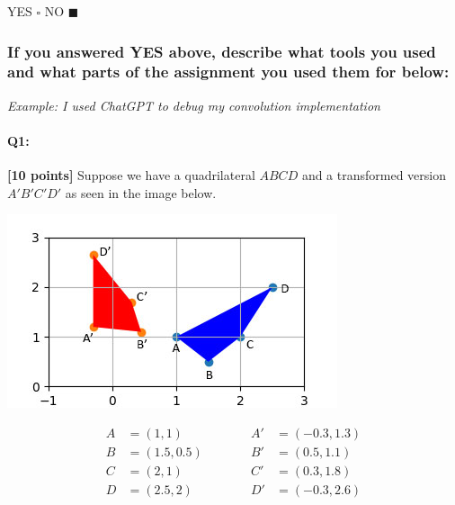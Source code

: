 
YES $\square$ NO $\blacksquare$ %


\subsubsection*{If you answered YES above, describe what tools you used and what parts of the assignment you used them for below:}


\textit{Example: I used ChatGPT to debug my convolution implementation}

\pagebreak
\paragraph{Q1:} \textbf{[10 points]}
Suppose we have a quadrilateral $ABCD$ and a transformed version $A'B'C'D'$ as seen in the image below.

\includegraphics[width=\textwidth * 5/10]{images/quadrilaterals.jpg}

\begin{equation}
\begin{split}
A&=(1, 1)\\
B&=(1.5, 0.5)\\
C&=(2, 1)\\
D&=(2.5, 2)
\end{split}
\quad\quad\quad
\begin{split}
A'&=(-0.3, 1.3)\\
B'&=(0.5, 1.1)\\
C'&=(0.3, 1.8)\\
D'&=(-0.3, 2.6)
\end{split}
\end{equation}

